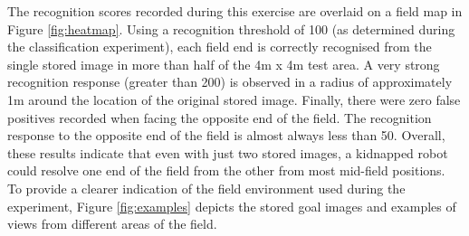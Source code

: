 \documentclass[runningheads,a4paper]{llncs}
\begin{document}
The recognition scores recorded during this exercise are overlaid on a field map in Figure \ref{fig:heatmap}. Using a recognition threshold of 100 (as determined during the classification experiment), each field end is correctly recognised from the single stored image in more than half of the 4m x 4m test area. A very strong recognition response (greater than 200) is observed in a radius of approximately 1m around the location of the original stored image. Finally, there were zero false positives recorded when facing the opposite end of the field. The recognition response to the opposite end of the field is almost always less than 50. Overall, these results indicate that even with just two stored images, a kidnapped robot could resolve one end of the field from the other from most mid-field positions. To provide a clearer indication of the field environment used during the experiment, Figure \ref{fig:examples} depicts the stored goal images and examples of views from different areas of the field. 
\end{document}
